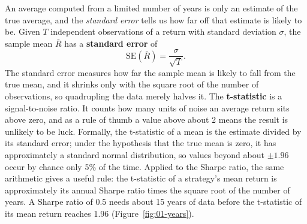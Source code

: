 An average computed from a limited number of years is only an estimate of the true average, and the \emph{standard error} tells us how far off that estimate is likely to be. Given $T$ independent observations of a return with standard deviation $\sigma$, the sample mean $\bar{R}$ has a \textbf{standard error} of
\begin{equation}
  \mathrm{SE}(\bar{R}) = \frac{\sigma}{\sqrt{T}}.
  \label{eq:01-se}
\end{equation}
The standard error measures how far the sample mean is likely to fall from the true mean, and it shrinks only with the square root of the number of observations, so quadrupling the data merely halves it. The \textbf{t-statistic} is a signal-to-noise ratio. It counts how many units of noise an average return sits above zero, and as a rule of thumb a value above about 2 means the result is unlikely to be luck. Formally, the t-statistic of a mean is the estimate divided by its standard error; under the hypothesis that the true mean is zero, it has approximately a standard normal distribution, so values beyond about $\pm 1.96$ occur by chance only 5\% of the time. Applied to the Sharpe ratio, the same arithmetic gives a useful rule: the t-statistic of a strategy's mean return is approximately its annual Sharpe ratio times the square root of the number of years. A Sharpe ratio of 0.5
needs about 15 years of data before the t-statistic of its mean return reaches 1.96 (Figure~\ref{fig:01-years}).




